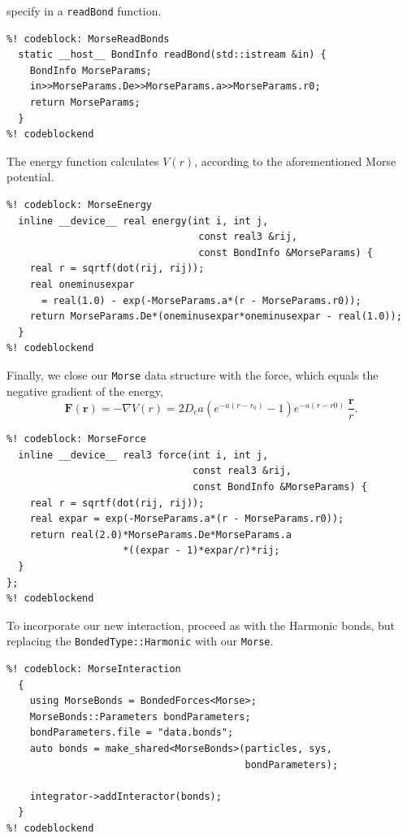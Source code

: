 specify in a \texttt{readBond} function.
\begin{lstlisting}
%! codeblock: MorseReadBonds
  static __host__ BondInfo readBond(std::istream &in) {
    BondInfo MorseParams;
    in>>MorseParams.De>>MorseParams.a>>MorseParams.r0;
    return MorseParams;
  }
%! codeblockend
\end{lstlisting}
The energy function calculates $V(r)$, according to the aforementioned Morse
potential.
\begin{lstlisting}
%! codeblock: MorseEnergy
  inline __device__ real energy(int i, int j,
                                 const real3 &rij,
                                 const BondInfo &MorseParams) {
    real r = sqrtf(dot(rij, rij));
    real oneminusexpar
      = real(1.0) - exp(-MorseParams.a*(r - MorseParams.r0));
    return MorseParams.De*(oneminusexpar*oneminusexpar - real(1.0));
  }
%! codeblockend
\end{lstlisting}
Finally, we close our \texttt{Morse} data structure with the force, which equals 
the negative gradient of the energy,
\begin{equation*}
  \mathbf{F}(\mathbf{r})
    = -\nabla V(r)
    = 2 D_e a \left(e^{-a(r - r_0)} - 1\right)
              e^{-a(r - r0)}\ \frac{\mathbf{r}}{r}.
\end{equation*}
\begin{lstlisting}
%! codeblock: MorseForce
  inline __device__ real3 force(int i, int j,
                                const real3 &rij,
                                const BondInfo &MorseParams) {
    real r = sqrtf(dot(rij, rij));
    real expar = exp(-MorseParams.a*(r - MorseParams.r0));
    return real(2.0)*MorseParams.De*MorseParams.a
                    *((expar - 1)*expar/r)*rij;
  }
};
%! codeblockend
\end{lstlisting}

To incorporate our new interaction, proceed as with the Harmonic bonds, but
replacing the \texttt{BondedType::Harmonic} with our \texttt{Morse}.
\begin{lstlisting}
%! codeblock: MorseInteraction
  {
    using MorseBonds = BondedForces<Morse>;
    MorseBonds::Parameters bondParameters;
    bondParameters.file = "data.bonds";
    auto bonds = make_shared<MorseBonds>(particles, sys,
                                         bondParameters);

    integrator->addInteractor(bonds);
  }
%! codeblockend
\end{lstlisting}

